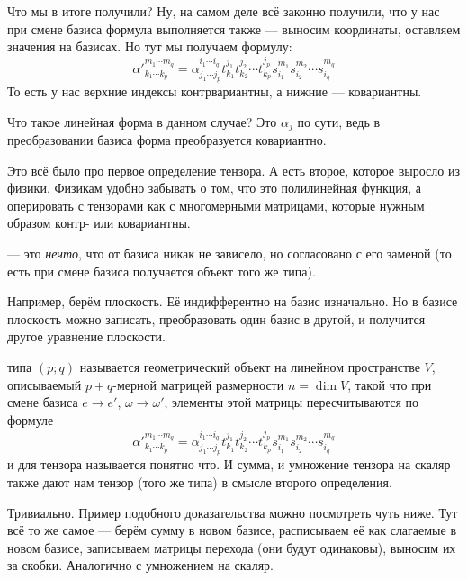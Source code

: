 \documentclass{article}
\begin{document}
\begin{itemize}
\[        \]
        Что мы в итоге получили? Ну, на самом деле всё законно получили, что у нас при смене базиса формула выполняется также --- выносим координаты, оставляем значения на базисах. Но тут мы получаем формулу:
        $$
        {\alpha'}^{m_1\cdots m_q}_{k_1\cdots k_p}=\alpha^{i_1\cdots i_q}_{j_1\cdots j_p}t_{k_1}^{j_1}t_{k_2}^{j_2}\cdots t_{k_p}^{j_p}s_{i_1}^{m_1}s_{i_2}^{m_2}\cdots s_{i_q}^{m_q}
        $$
        То есть у нас верхние индексы контрвариантны, а нижние --- ковариантны.
        \begin{Example}
            Что такое линейная форма в данном случае? Это $\alpha_j$ по сути, ведь в преобразовании базиса форма преобразуется ковариантно.
        \end{Example}
        \begin{Comment}
            Это всё было про первое определение тензора. А есть второе, которое выросло из физики. Физикам удобно забывать о том, что это полилинейная функция, а оперировать с тензорами как с многомерными матрицами, которые нужным образом контр- или ковариантны.
        \end{Comment}
        \dfn {} --- это \textit{нечто}, что от базиса никак не зависело, но согласовано с его заменой (то есть при смене базиса получается объект того же типа).
        \begin{Example}
            Например, берём плоскость. Её индифферентно на базис изначально. Но в базисе плоскость можно записать, преобразовать один базис в другой, и получится другое уравнение плоскости.
        \end{Example}
        \dfn {} типа $(p;q)$ называется геометрический объект на линейном пространстве $V$, описываемый $p+q$-мерной матрицей размерности $n=\dim V$, такой что при смене базиса $e\to e'$, $\omega\to\omega'$, элементы этой матрицы пересчитываются по формуле
        $$
        {\alpha'}^{m_1\cdots m_q}_{k_1\cdots k_p}=\alpha^{i_1\cdots i_q}_{j_1\cdots j_p}t_{k_1}^{j_1}t_{k_2}^{j_2}\cdots t_{k_p}^{j_p}s_{i_1}^{m_1}s_{i_2}^{m_2}\cdots s_{i_q}^{m_q}
        $$
        \dfn {} и  для тензора называется понятно что.
        \thm И сумма, и умножение тензора на скаляр также дают нам тензор (того же типа) в смысле второго определения.
        \begin{Proof}
            Тривиально. Пример подобного доказательства можно посмотреть чуть ниже. Тут всё то же самое --- берём сумму в новом базисе, расписываем её как слагаемые в новом базисе, записываем матрицы перехода (они будут одинаковы), выносим их за скобки. Аналогично с умножением на скаляр.

\end{Proof}
\end{itemize}
\end{document}
